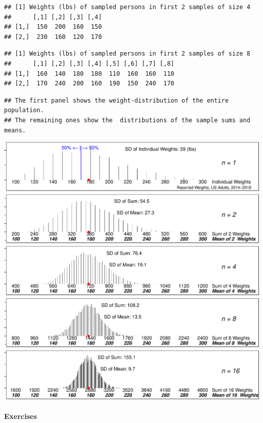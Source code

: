 \documentclass[
]{article}
\begin{document}
\begin{verbatim}
## [1] Weights (lbs) of sampled persons in first 2 samples of size 4
##      [,1] [,2] [,3] [,4]
## [1,]  150  200  160  150
## [2,]  230  160  120  170
\end{verbatim}

\begin{verbatim}
## [1] Weights (lbs) of sampled persons in first 2 samples of size 8
##      [,1] [,2] [,3] [,4] [,5] [,6] [,7] [,8]
## [1,]  160  140  180  180  110  160  160  110
## [2,]  170  240  200  160  190  150  240  170
\end{verbatim}

\begin{verbatim}
## The first panel shows the weight-distribution of the entire population.
## The remaining ones show the  distributions of the sample sums and means.
\end{verbatim}

\begin{center}\includegraphics{hanley-computing_files/figure-latex/unnamed-chunk-7-1} \end{center}

\hypertarget{exercises-1}{%
\paragraph{Exercises}\label{exercises-1}}
\end{document}
